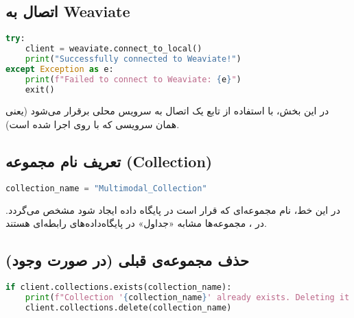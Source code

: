 \documentclass{article}
\begin{document}

\subsection{اتصال به Weaviate}

\begin{latin}
\begin{lstlisting}[language=python]
try:
    client = weaviate.connect_to_local()
    print("Successfully connected to Weaviate!")
except Exception as e:
    print(f"Failed to connect to Weaviate: {e}")
    exit()
\end{lstlisting}
\end{latin}

در این بخش، با استفاده از تابع  یک اتصال به سرویس محلی  برقرار می‌شود (یعنی همان سرویسی که با  روی  اجرا شده است).


\subsection{تعریف نام مجموعه (Collection)}

\begin{latin}
\begin{lstlisting}[language=python]
collection_name = "Multimodal_Collection"
\end{lstlisting}
\end{latin}

در این خط، نام مجموعه‌ای که قرار است در پایگاه داده ایجاد شود مشخص می‌گردد.  
در ، مجموعه‌ها مشابه «جداول» در پایگاه‌داده‌های رابطه‌ای هستند.


\subsection{حذف مجموعه‌ی قبلی (در صورت وجود)}

\begin{latin}
\begin{lstlisting}[language=python]
if client.collections.exists(collection_name):
    print(f"Collection '{collection_name}' already exists. Deleting it.")
    client.collections.delete(collection_name)
\end{lstlisting}
\end{latin}
\end{document}
